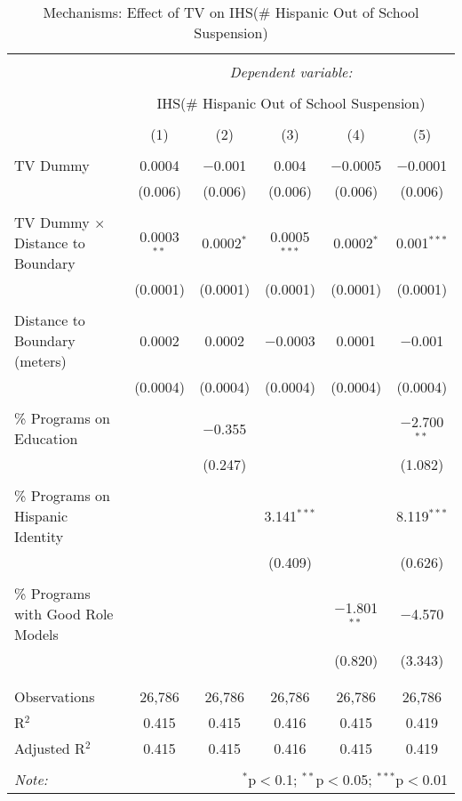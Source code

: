 
\begin{table}[!htbp] \centering 
  \caption{Mechanisms: Effect of TV on IHS(\# Hispanic Out of School Suspension)} 
  \label{} 
\begin{tabular}{@{\extracolsep{-2pt}}lccccc} 
\\[-1.8ex]\hline 
\hline \\[-1.8ex] 
 & \multicolumn{5}{c}{\textit{Dependent variable:}} \\ 
\cline{2-6} 
\\[-1.8ex] & \multicolumn{5}{c}{IHS(\# Hispanic Out of School Suspension)} \\ 
\\[-1.8ex] & (1) & (2) & (3) & (4) & (5)\\ 
\hline \\[-1.8ex] 
 TV Dummy & 0.0004 & $-$0.001 & 0.004 & $-$0.0005 & $-$0.0001 \\ 
  & (0.006) & (0.006) & (0.006) & (0.006) & (0.006) \\ 
  & & & & & \\ 
 TV Dummy $\times$ Distance to Boundary & 0.0003$^{**}$ & 0.0002$^{*}$ & 0.0005$^{***}$ & 0.0002$^{*}$ & 0.001$^{***}$ \\ 
  & (0.0001) & (0.0001) & (0.0001) & (0.0001) & (0.0001) \\ 
  & & & & & \\ 
 Distance to Boundary (meters) & 0.0002 & 0.0002 & $-$0.0003 & 0.0001 & $-$0.001 \\ 
  & (0.0004) & (0.0004) & (0.0004) & (0.0004) & (0.0004) \\ 
  & & & & & \\ 
 \% Programs on Education &  & $-$0.355 &  &  & $-$2.700$^{**}$ \\ 
  &  & (0.247) &  &  & (1.082) \\ 
  & & & & & \\ 
 \% Programs on Hispanic Identity &  &  & 3.141$^{***}$ &  & 8.119$^{***}$ \\ 
  &  &  & (0.409) &  & (0.626) \\ 
  & & & & & \\ 
 \% Programs with Good Role Models &  &  &  & $-$1.801$^{**}$ & $-$4.570 \\ 
  &  &  &  & (0.820) & (3.343) \\ 
  & & & & & \\ 
\hline \\[-1.8ex] 
Observations & 26,786 & 26,786 & 26,786 & 26,786 & 26,786 \\ 
R$^{2}$ & 0.415 & 0.415 & 0.416 & 0.415 & 0.419 \\ 
Adjusted R$^{2}$ & 0.415 & 0.415 & 0.416 & 0.415 & 0.419 \\ 
\hline 
\hline \\[-1.8ex] 
\textit{Note:}  & \multicolumn{5}{r}{$^{*}$p$<$0.1; $^{**}$p$<$0.05; $^{***}$p$<$0.01} \\ 
\end{tabular} 
\end{table} 
